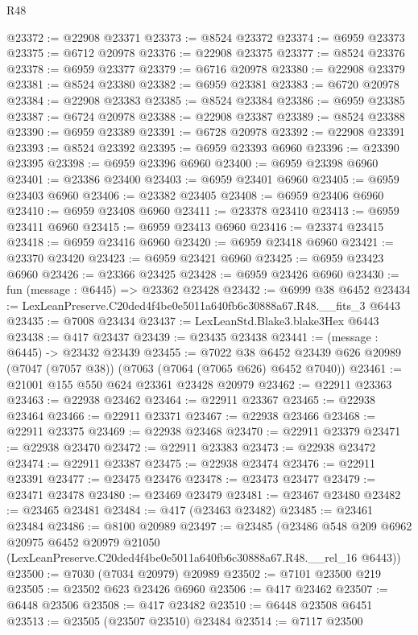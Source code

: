 \begin{lexlean}{R48}
\begin{coremodule}
@23372 := @22908 @23371
@23373 := @8524 @23372
@23374 := @6959 @23373
@23375 := @6712 @20978
@23376 := @22908 @23375
@23377 := @8524 @23376
@23378 := @6959 @23377
@23379 := @6716 @20978
@23380 := @22908 @23379
@23381 := @8524 @23380
@23382 := @6959 @23381
@23383 := @6720 @20978
@23384 := @22908 @23383
@23385 := @8524 @23384
@23386 := @6959 @23385
@23387 := @6724 @20978
@23388 := @22908 @23387
@23389 := @8524 @23388
@23390 := @6959 @23389
@23391 := @6728 @20978
@23392 := @22908 @23391
@23393 := @8524 @23392
@23395 := @6959 @23393 @6960
@23396 := @23390 @23395
@23398 := @6959 @23396 @6960
@23400 := @6959 @23398 @6960
@23401 := @23386 @23400
@23403 := @6959 @23401 @6960
@23405 := @6959 @23403 @6960
@23406 := @23382 @23405
@23408 := @6959 @23406 @6960
@23410 := @6959 @23408 @6960
@23411 := @23378 @23410
@23413 := @6959 @23411 @6960
@23415 := @6959 @23413 @6960
@23416 := @23374 @23415
@23418 := @6959 @23416 @6960
@23420 := @6959 @23418 @6960
@23421 := @23370 @23420
@23423 := @6959 @23421 @6960
@23425 := @6959 @23423 @6960
@23426 := @23366 @23425
@23428 := @6959 @23426 @6960
@23430 := fun (message : @6445) => @23362 @23428
@23432 := @6999 @38 @6452
@23434 := LexLeanPreserve.C20ded4f4be0e5011a640fb6c30888a67.R48.__fits_3 @6443
@23435 := @7008 @23434
@23437 := LexLeanStd.Blake3.blake3Hex @6443
@23438 := @417 @23437
@23439 := @23435 @23438
@23441 := (message : @6445) -> @23432 @23439
@23455 := @7022
    @38
    @6452
    @23439
    @626
    @20989
    (@7047 (@7057 @38))
    (@7063 (@7064 (@7065 @626) @6452 @7040))
@23461 := @21001 @155 @550 @624 @23361 @23428 @20979
@23462 := @22911 @23363
@23463 := @22938 @23462
@23464 := @22911 @23367
@23465 := @22938 @23464
@23466 := @22911 @23371
@23467 := @22938 @23466
@23468 := @22911 @23375
@23469 := @22938 @23468
@23470 := @22911 @23379
@23471 := @22938 @23470
@23472 := @22911 @23383
@23473 := @22938 @23472
@23474 := @22911 @23387
@23475 := @22938 @23474
@23476 := @22911 @23391
@23477 := @23475 @23476
@23478 := @23473 @23477
@23479 := @23471 @23478
@23480 := @23469 @23479
@23481 := @23467 @23480
@23482 := @23465 @23481
@23484 := @417 (@23463 @23482)
@23485 := @23461 @23484
@23486 := @8100 @20989
@23497 := @23485
    (@23486
      @548
      @209
      @6962
      @20975
      @6452
      @20979
      @21050
      (LexLeanPreserve.C20ded4f4be0e5011a640fb6c30888a67.R48.__rel_16 @6443))
@23500 := @7030 (@7034 @20979) @20989
@23502 := @7101 @23500 @219
@23505 := @23502 @623 @23426 @6960
@23506 := @417 @23462
@23507 := @6448 @23506
@23508 := @417 @23482
@23510 := @6448 @23508 @6451
@23513 := @23505 (@23507 @23510) @23484
@23514 := @7117 @23500

\end{coremodule}
\end{lexlean}
